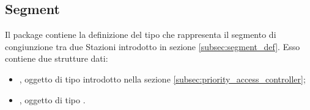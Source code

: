 \subsection{Segment}
	
	Il package  contiene la definizione del tipo   che rappresenta il segmento di congiunzione tra due Stazioni introdotto in sezione \ref{subsec:segment_def}. Esso contiene due strutture dati:
	\begin{itemize}
		\item {}, oggetto di tipo  introdotto nella sezione \ref{subsec:priority_access_controller};
		\item {}, oggetto di tipo .
	\end{itemize}
	

